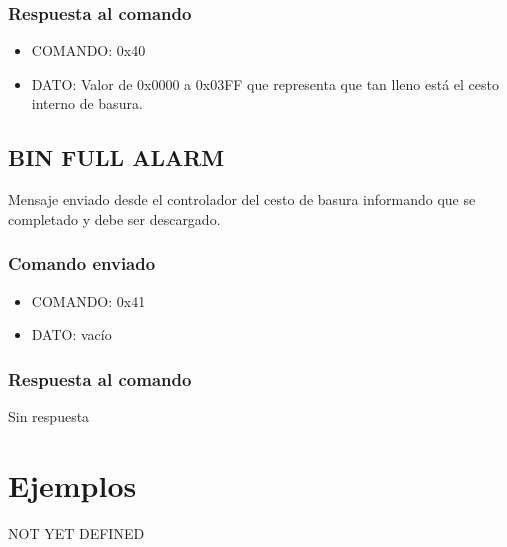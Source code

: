 \documentclass[a4paper,10pt]{article}
\begin{document}
\subsubsection*{Respuesta al comando}

\begin{itemize}
	\item{COMANDO:} 0x40
	\item{DATO:} Valor de 0x0000 a 0x03FF que representa que tan lleno est\'a el cesto interno de basura.
\end{itemize}

\subsection{BIN FULL ALARM}
\label{bin_full_alarm}

Mensaje enviado desde el controlador del cesto de basura informando que se completado y debe ser descargado.

\subsubsection*{Comando enviado}

\begin{itemize}
	\item{COMANDO:} 0x41
	\item{DATO:} vac\'io
\end{itemize}

\subsubsection*{Respuesta al comando}

Sin respuesta


\section{Ejemplos}
\label{ejemplos}

NOT YET DEFINED
\end{document}

